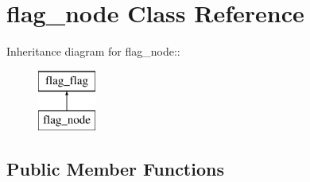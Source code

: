 \hypertarget{classflag__node}{
\section{flag\_\-node Class Reference}
\label{classflag__node}
}
Inheritance diagram for flag\_\-node::\begin{figure}[H]
\begin{center}
\leavevmode
\includegraphics[height=2cm]{classflag__node}
\end{center}
\end{figure}
\subsection*{Public Member Functions}
